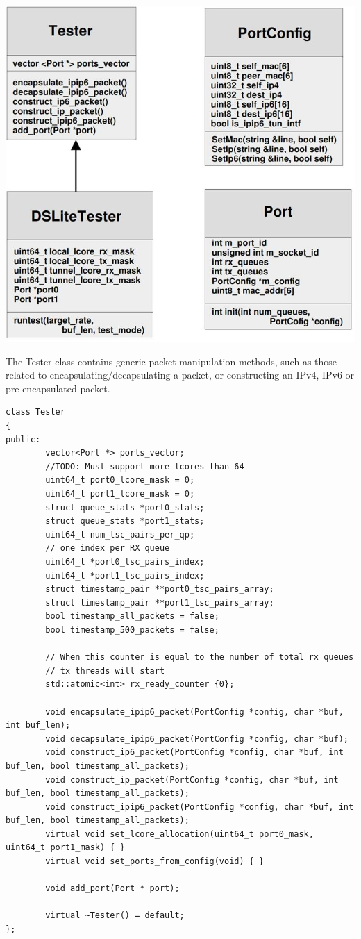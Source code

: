 \documentclass[a4paper,12p]{article}
\begin{document}
\includegraphics[width=\textwidth]{classdiagram}

The Tester class contains generic packet manipulation methods, such as those related to encapsulating/decapsulating a packet, or constructing an IPv4, IPv6 or pre-encapsulated packet. 

\begin{lstlisting}
class Tester
{
public:
        vector<Port *> ports_vector;
        //TODO: Must support more lcores than 64
        uint64_t port0_lcore_mask = 0;
        uint64_t port1_lcore_mask = 0;
        struct queue_stats *port0_stats;
        struct queue_stats *port1_stats;
        uint64_t num_tsc_pairs_per_qp;
        // one index per RX queue
        uint64_t *port0_tsc_pairs_index;
        uint64_t *port1_tsc_pairs_index;
        struct timestamp_pair **port0_tsc_pairs_array;
        struct timestamp_pair **port1_tsc_pairs_array;
        bool timestamp_all_packets = false;
        bool timestamp_500_packets = false;

        // When this counter is equal to the number of total rx queues
        // tx threads will start
        std::atomic<int> rx_ready_counter {0};

        void encapsulate_ipip6_packet(PortConfig *config, char *buf, int buf_len);
        void decapsulate_ipip6_packet(PortConfig *config, char *buf);
        void construct_ip6_packet(PortConfig *config, char *buf, int buf_len, bool timestamp_all_packets);
        void construct_ip_packet(PortConfig *config, char *buf, int buf_len, bool timestamp_all_packets);
        void construct_ipip6_packet(PortConfig *config, char *buf, int buf_len, bool timestamp_all_packets);
        virtual void set_lcore_allocation(uint64_t port0_mask, uint64_t port1_mask) { }
        virtual void set_ports_from_config(void) { }

        void add_port(Port * port);

        virtual ~Tester() = default;
};
\end{lstlisting}
\end{document}
